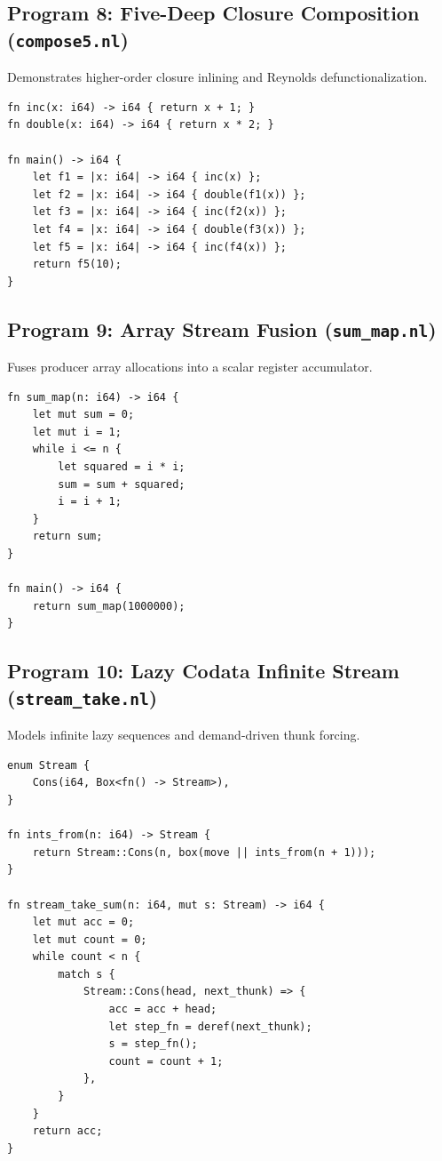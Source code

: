 \subsection{Program 8: Five-Deep Closure Composition (\texttt{compose5.nl})}
Demonstrates higher-order closure inlining and Reynolds defunctionalization.

\begin{lstlisting}[language=NumLang, caption={Chained Closure Composition in NumLang.}]
fn inc(x: i64) -> i64 { return x + 1; }
fn double(x: i64) -> i64 { return x * 2; }

fn main() -> i64 {
    let f1 = |x: i64| -> i64 { inc(x) };
    let f2 = |x: i64| -> i64 { double(f1(x)) };
    let f3 = |x: i64| -> i64 { inc(f2(x)) };
    let f4 = |x: i64| -> i64 { double(f3(x)) };
    let f5 = |x: i64| -> i64 { inc(f4(x)) };
    return f5(10);
}
\end{lstlisting}

\subsection{Program 9: Array Stream Fusion (\texttt{sum\_map.nl})}
Fuses producer array allocations into a scalar register accumulator.

\begin{lstlisting}[language=NumLang, caption={Stream Map-Sum Pipeline in NumLang.}]
fn sum_map(n: i64) -> i64 {
    let mut sum = 0;
    let mut i = 1;
    while i <= n {
        let squared = i * i;
        sum = sum + squared;
        i = i + 1;
    }
    return sum;
}

fn main() -> i64 {
    return sum_map(1000000);
}
\end{lstlisting}

\subsection{Program 10: Lazy Codata Infinite Stream (\texttt{stream\_take.nl})}
Models infinite lazy sequences and demand-driven thunk forcing.

\begin{lstlisting}[language=NumLang, caption={Lazy Codata Stream Pipeline in NumLang.}]
enum Stream {
    Cons(i64, Box<fn() -> Stream>),
}

fn ints_from(n: i64) -> Stream {
    return Stream::Cons(n, box(move || ints_from(n + 1)));
}

fn stream_take_sum(n: i64, mut s: Stream) -> i64 {
    let mut acc = 0;
    let mut count = 0;
    while count < n {
        match s {
            Stream::Cons(head, next_thunk) => {
                acc = acc + head;
                let step_fn = deref(next_thunk);
                s = step_fn();
                count = count + 1;
            },
        }
    }
    return acc;
}
\end{lstlisting}

